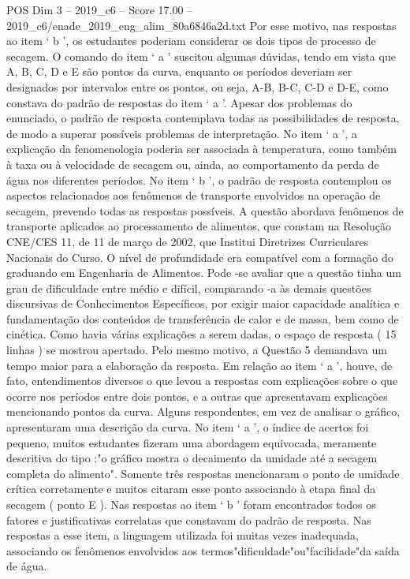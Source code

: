 \begin{textsample}{POS Dim 3 – 2019\_c6 – Score 17.00 – 2019\_c6/enade\_2019\_eng\_alim\_80a6846a2d.txt}
Por esse motivo, nas respostas ao item ‘ b ’, os estudantes poderiam considerar os dois tipos de processo de secagem.
O comando do item ‘ a ’ suscitou algumas dúvidas, tendo em vista que A, B, C, D e E são pontos da curva, enquanto os períodos deveriam ser designados por intervalos entre os pontos, ou seja, A-B, B-C, C-D e D-E, como constava do padrão de respostas do item ‘ a ’.
Apesar dos problemas do enunciado, o padrão de resposta contemplava todas as possibilidades de resposta, de modo a superar possíveis problemas de interpretação.
No item ‘ a ’, a explicação da fenomenologia poderia ser associada à temperatura, como também à taxa ou à velocidade de secagem ou, ainda, ao comportamento da perda de água nos diferentes períodos.
No item ‘ b ’, o padrão de resposta contemplou os aspectos relacionados aos fenômenos de transporte envolvidos na operação de secagem, prevendo todas as respostas possíveis.
A questão abordava fenômenos de transporte aplicados ao processamento de alimentos, que constam na Resolução CNE/CES 11, de 11 de março de 2002, que Institui Diretrizes Curriculares Nacionais do Curso.
O nível de profundidade era compatível com a formação do graduando em Engenharia de Alimentos.
Pode -se avaliar que a questão tinha um grau de dificuldade entre médio e difícil, comparando -a às demais questões discursivas de Conhecimentos Específicos, por exigir maior capacidade analítica e fundamentação dos conteúdos de transferência de calor e de massa, bem como de cinética.
Como havia várias explicações a serem dadas, o espaço de resposta ( 15 linhas ) se mostrou apertado.
Pelo mesmo motivo, a Questão 5 demandava um tempo maior para a elaboração da resposta.
Em relação ao item ‘ a ’, houve, de fato, entendimentos diversos o que levou a respostas com explicações sobre o que ocorre nos períodos entre dois pontos, e a outras que apresentavam explicações mencionando pontos da curva.
Alguns respondentes, em vez de analisar o gráfico, apresentaram uma descrição da curva.
No item ‘ a ’, o índice de acertos foi pequeno, muitos estudantes fizeram uma abordagem equivocada, meramente descritiva do tipo :"o gráfico mostra o decaimento da umidade até a secagem completa do alimento".
Somente três respostas mencionaram o ponto de umidade crítica corretamente e muitos citaram esse ponto associando à etapa final da secagem ( ponto E ).
Nas respostas ao item ‘ b ’ foram encontrados todos os fatores e justificativas correlatas que constavam do padrão de resposta.
Nas respostas a esse item, a linguagem utilizada foi muitas vezes inadequada, associando os fenômenos envolvidos aos termos"dificuldade"ou"facilidade"da saída de água.

\end{textsample}

